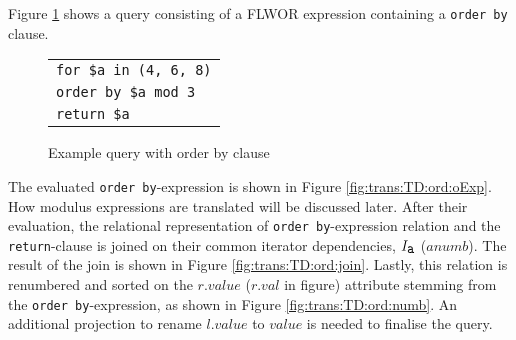\begin{myExample}
Figure \ref{fig:trans:TD:ordQu} shows a query consisting of a FLWOR expression containing a \texttt{order by} clause.
\begin{figure}[h]
\centering
\begin{tabular}{l}
\texttt{for \$a in (4, 6, 8)} \\
\texttt{order by \$a mod 3}\\
\texttt{return \$a}\\
\end{tabular}
\caption{Example query with order by clause \label{fig:trans:TD:ordQu}}
\end{figure}

The evaluated \texttt{order by}-expression is shown in Figure \ref{fig:trans:TD:ord:oExp}. How modulus expressions
are translated will be discussed later. After their evaluation, the relational representation of \texttt{order
by}-expression relation and the \texttt{return}-clause is joined on their common iterator dependencies,
$I_{\mbox{\texttt{a}}}$ ($anumb$). The result of the join is shown in Figure \ref{fig:trans:TD:ord:join}. Lastly,
this relation is renumbered and sorted on the $r.value$ ($r.val$ in figure) attribute stemming from the
\texttt{order by}-expression, as shown in Figure \ref{fig:trans:TD:ord:numb}. An additional projection to rename
$l.value$ to $value$ is needed to finalise the query.

\begin{figure}[h]
\centering
{}
\qquad
{}
\qquad
{}



\end{figure}
\end{myExample}

